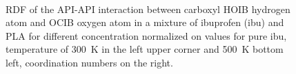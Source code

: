\begin{figure}[H]
	\centering
	 \\
	\vspace{-0.3cm}
	\caption{RDF of the API-API interaction between carboxyl HOIB hydrogen atom and OCIB oxygen atom in a mixture of ibuprofen (ibu) and PLA for different concentration normalized on values for pure ibu, temperature of 300~K in the left upper corner and 500~K bottom left, coordination numbers on the right.}
	\label{fig:ibu_s_RDF_}
\end{figure}

